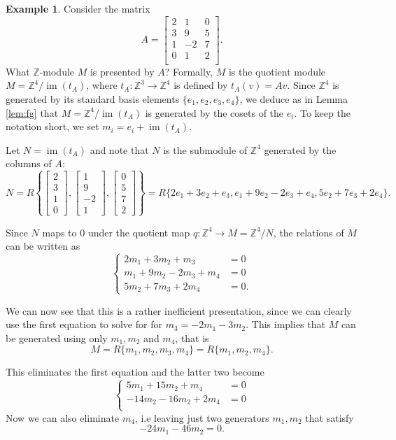 \documentclass[12pt]{report}
\numberwithin{equation}{section}
\numberwithin{theorem}{chapter}
\theoremstyle{definition}
\newtheorem{example}[theorem]{Example}
\newtheorem*{basic properties}{Basic Properties}
\newtheorem*{Important Remark}{Important Remark}
\newcommand{\Z}{\mathbb{Z}}
\DeclareMathOperator{\im}{im}
\begin{document}
\begin{example}
Consider the matrix
$$
A =
\begin{bmatrix}
2 & 1 & 0 \\
3 & 9 & 5 \\
1 & -2 & 7 \\
0 & 1 & 2 \\
\end{bmatrix}.
$$
What $\Z$-module $M$ is presented by $A$?
Formally, $M$ is the quotient module $M=\Z^4/\im(t_A)$, where $t_A \!:\Z^3 \to \Z^4$ is defined by $t_A(v)=Av$. Since $\Z^4$ is generated by its standard basis elements $\{e_1,e_2,e_3,e_4\}$, we deduce as in Lemma \ref{lem:fg} that $M=\Z^4/\im(t_A)$ is generated by the cosets of the $e_i$. To keep the notation short, we set $m_i=e_i+\im(t_A)$.



Let $N=\im(t_A)$ and note that $N$ is the submodule of $\Z^4$ generated by the columns of $A$:
$$N=R\left\{\begin{bmatrix} 2 \\ 3 \\ 1\\ 0 \end{bmatrix}, \begin{bmatrix} 1 \\ 9 \\ -2 \\1 \end{bmatrix},\begin{bmatrix} 0 \\ 5 \\ 7\\2 \end{bmatrix}\right\}=R\{2e_1 + 3e_2 + e_3,e_1 + 9e_2 -2 e_3 + e_4, 5e_2 + 7 e_3 + 2 e_4  \}.$$

Since $N$ maps to $0$ under the quotient map $q\!:\Z^4\to M=\Z^4/N$, the relations of $M$ 
can be written as
$$
\begin{cases}
2m_1 + 3m_2 + m_3 & = 0 \\
m_1 + 9m_2 -2 m_3 + m_4 & = 0 \\
5m_2 + 7 m_3 + 2 m_4 & = 0. 
\end{cases}
$$

We can now see that this is a rather inefficient presentation, since we can clearly use the first equation to solve for for $m_3=-2m_1 - 3m_2$. This implies that $M$ can be generated using only $m_1, m_2$ and $m_4$, that is
$$M=R\{m_1,m_2,m_3,m_4\}=R\{m_1,m_2,m_4\}.$$

This eliminates the first equation and the latter two become
$$
\begin{cases}
5m_1 + 15m_2 + m_4 & = 0 \\
-14m_2  -16m_2 + 2m_4 & = 0 \\
\end{cases}
$$
Now we can also eliminate $m_4$, i.e  leaving just two generators $m_1, m_2$ that satisfy
$$
-24m_1 -46m_2 = 0.
$$


\end{example}
\end{document}
